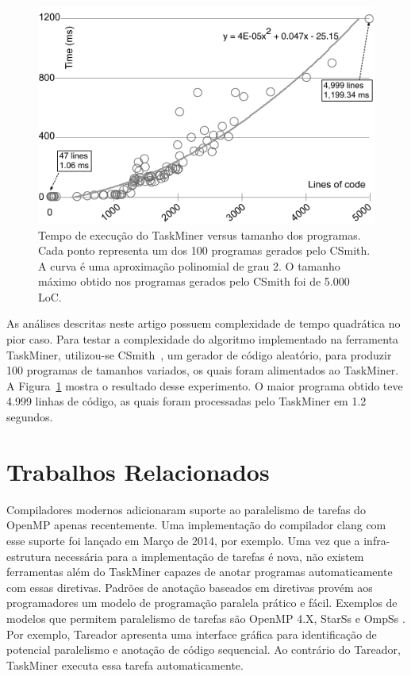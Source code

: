 \documentclass[sigplan,10pt,review]{acmart}
\newcommand\Taskminer{\mbox{\textsf{TaskMiner}}}
\begin{document}
\begin{figure}[htb]
\begin{center}
\includegraphics[width=0.9\columnwidth]{images/TM_Runtime}
\caption{Tempo de execução do \Taskminer{} versus tamanho dos programas.
Cada ponto representa um dos 100 programas gerados pelo \textsf{CSmith}.
A curva é uma aproximação polinomial de grau 2. O tamanho máximo obtido 
nos programas gerados pelo CSmith foi de 5.000 LoC.}
\label{fig:TM_Runtime}
\end{center}
\end{figure}

As análises descritas neste artigo possuem complexidade de tempo quadrática no pior caso.
Para testar a complexidade do algoritmo implementado na ferramenta \Taskminer{}, 
utilizou-se \textsf{CSmith}~\cite{Yang11}, um gerador de código aleatório, para produzir 
100 programas de tamanhos variados, os quais foram alimentados ao \Taskminer{}. 
A Figura~\ref{fig:TM_Runtime} mostra o resultado desse experimento.
O maior programa obtido teve 4.999 linhas de código, as quais foram processadas
pelo \Taskminer{} em 1.2 segundos.

\section{Trabalhos Relacionados}
\label{sec:rw}

Compiladores modernos adicionaram suporte ao paralelismo de tarefas do OpenMP apenas recentemente. Uma implementação
do compilador \textsf{clang} com esse suporte foi lançado em Março de 2014, por exemplo. Uma vez que a infra-estrutura necessária para
a implementação de tarefas é nova, não existem ferramentas além do {\Taskminer} capazes de anotar programas
automaticamente com essas diretivas.
Padrões de anotação baseados em diretivas provém aos programadores um modelo de programação paralela prático e fácil. Exemplos
de modelos que permitem paralelismo de tarefas são OpenMP 4.X,
StarSs \cite{bellens:sc:2006, perez:iccc:2008, planas:hpca:2009,
tejedor:hpdc:2011} e OmpSs \cite{bueno:icpp:2011, duran:ppl:2011}.
Por exemplo, Tareador \cite{Ayguade15} apresenta uma interface gráfica para identificação de potencial paralelismo e anotação de código sequencial.
Ao contrário do Tareador, {\Taskminer} executa essa tarefa automaticamente.
\end{document}
